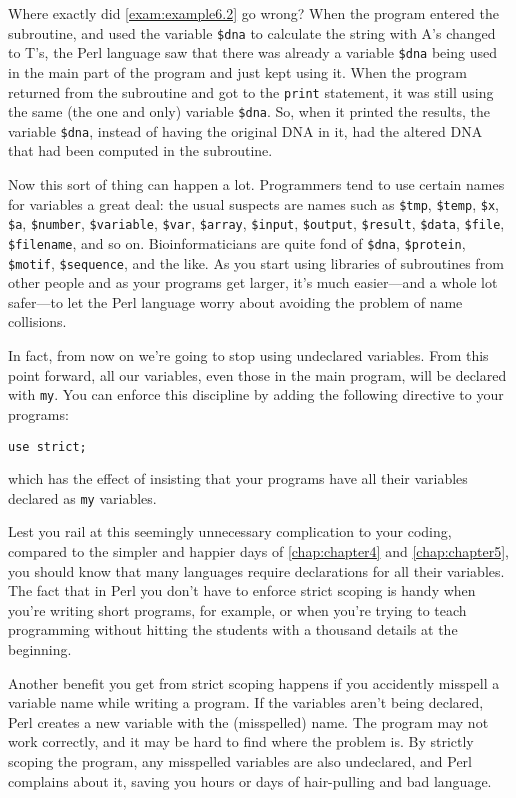 Where exactly did \autoref{exam:example6.2} go wrong? When the program entered the subroutine, and used the variable \verb|$dna| to calculate the string with A's changed to T's, the Perl language saw that there was already a variable \verb|$dna| being used in the main part of the program and just kept using it. When the program returned from the subroutine and got to the \verb|print| statement, it was still using the same (the one and only) variable \verb|$dna|. So, when it printed the results, the variable \verb|$dna|, instead of having the original DNA in it, had the altered DNA that had been computed in the subroutine.

Now this sort of thing can happen a lot. Programmers tend to use certain names for variables a great deal: the usual suspects are names such as \verb|$tmp|, \verb|$temp|, \verb|$x|, \verb|$a|, \verb|$number|, \verb|$variable|, \verb|$var|, \verb|$array|, \verb|$input|, \verb|$output|, \verb|$result|, \verb|$data|, \verb|$file|, \verb|$filename|, and so on. Bioinformaticians are quite fond of \verb|$dna|, \verb|$protein|, \verb|$motif|, \verb|$sequence|, and the like. As you start using libraries of subroutines from other people and as your programs get larger, it's much easier—and a whole lot safer—to let the Perl language worry about avoiding the problem of name collisions.

In fact, from now on we're going to stop using undeclared variables. From this point forward, all our variables, even those in the main program, will be declared with \verb|my|. You can enforce this discipline by adding the following directive to your programs:

\begin{lstlisting}
use strict;
\end{lstlisting}

which has the effect of insisting that your programs have all their variables declared as \verb|my| variables.

Lest you rail at this seemingly unnecessary complication to your coding, compared to the simpler and happier days of \autoref{chap:chapter4} and \autoref{chap:chapter5}, you should know that many languages require declarations for all their variables. The fact that in Perl you don't have to enforce strict scoping is handy when you're writing short programs, for example, or when you're trying to teach programming without hitting the students with a thousand details at the beginning.

Another benefit you get from strict scoping happens if you accidently misspell a variable name while writing a program. If the variables aren't being declared, Perl creates a new variable with the (misspelled) name. The program may not work correctly, and it may be hard to find where the problem is. By strictly scoping the program, any misspelled variables are also undeclared, and Perl complains about it, saving you hours or days of hair-pulling and bad language.

